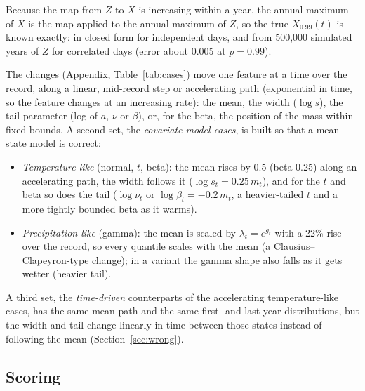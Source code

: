 \documentclass[11pt]{article}
\begin{document}
Because the map from $Z$ to $X$ is increasing within a year, the annual maximum of $X$ is the map
applied to the annual maximum of $Z$, so the true $X_{0.99}(t)$ is known exactly: in closed form
for independent days, and from 500,000 simulated years of $Z$ for correlated days (error about
0.005 at $p=0.99$).

The changes (Appendix, Table~\ref{tab:cases}) move one feature at a time over the record, along
a linear, mid-record step or accelerating path (exponential in time, so the feature changes at an
increasing rate): the mean, the width ($\log s$), the
tail parameter (log of $a$, $\nu$ or $\beta$), or, for the beta, the position of the mass within
fixed bounds. A second set, the \emph{covariate-model cases}, is built so that a mean-state model
is correct:
\begin{itemize}
\item \emph{Temperature-like} (normal, $t$, beta): the mean rises by 0.5 (beta 0.25) along an
  accelerating path, the width follows it ($\log s_t=0.25\,m_t$), and for the $t$ and beta so
  does the tail ($\log\nu_t$ or $\log\beta_t=-0.2\,m_t$, a heavier-tailed $t$ and a more tightly
  bounded beta as it warms).
\item \emph{Precipitation-like} (gamma): the mean is scaled by $\lambda_t=e^{g_t}$ with a 22\% rise
  over the record, so every quantile scales with the mean (a Clausius--Clapeyron-type change);
  in a variant the gamma shape also falls as it gets wetter (heavier tail).
\end{itemize}
A third set, the \emph{time-driven} counterparts of the accelerating temperature-like cases, has the
same mean path and the same first- and last-year distributions, but the width and tail change
linearly in time between those states instead of following the mean (Section~\ref{sec:wrong}).

\subsection{Scoring}
\end{document}
